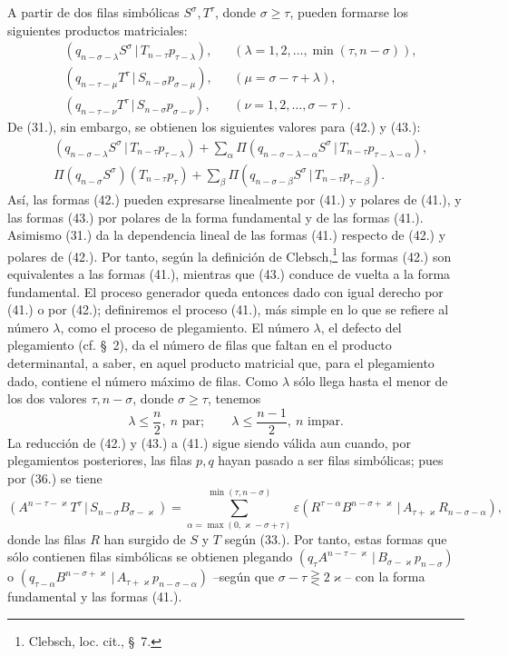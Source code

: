 \documentclass[11pt]{article}
\newcommand{\pair}[2]{(#1\,|\,#2)}
\newcommand{\eps}{\varepsilon}
\begin{document}
A partir de dos filas simbólicas $S^\sigma,T^\tau$, donde $\sigma\ge\tau$, pueden formarse los siguientes productos matriciales:
\begin{align}
&\pair{q_{n-\sigma-\lambda}S^\sigma}{T_{n-\tau}p_{\tau-\lambda}}, &&(\lambda=1,2,\ldots,\min(\tau,n-\sigma)),\tag{41}\\
&\pair{q_{n-\tau-\mu}T^\tau}{S_{n-\sigma}p_{\sigma-\mu}}, &&(\mu=\sigma-\tau+\lambda),\tag{42}\\
&\pair{q_{n-\tau-\nu}T^\tau}{S_{n-\sigma}p_{\sigma-\nu}}, &&(\nu=1,2,\ldots,\sigma-\tau).
\tag{43}
\end{align}
De (31.), sin embargo, se obtienen los siguientes valores para (42.) y (43.):
\begin{align}
&\pair{q_{n-\sigma-\lambda}S^\sigma}{T_{n-\tau}p_{\tau-\lambda}}
 +\sum_{\alpha}\Pi\pair{q_{n-\sigma-\lambda-\alpha}S^\sigma}{T_{n-\tau}p_{\tau-\lambda-\alpha}},\tag{42a}\\
&\Pi(q_{n-\sigma}S^\sigma)(T_{n-\tau}p_\tau)
 +\sum_{\beta}\Pi\pair{q_{n-\sigma-\beta}S^\sigma}{T_{n-\tau}p_{\tau-\beta}}.
\tag{43a}
\end{align}
Así, las formas (42.) pueden expresarse linealmente por (41.) y polares de (41.), y las formas (43.) por polares de la forma fundamental y de las formas (41.). Asimismo (31.) da la dependencia lineal de las formas (41.) respecto de (42.) y polares de (42.). Por tanto, según la definición de Clebsch,\footnote{Clebsch, loc. cit., \S\ 7.} las formas (42.) son equivalentes a las formas (41.), mientras que (43.) conduce de vuelta a la forma fundamental. El proceso generador queda entonces dado con igual derecho por (41.) o por (42.); definiremos el proceso (41.), más simple en lo que se refiere al número $\lambda$, como el proceso de plegamiento. El número $\lambda$, el defecto del plegamiento (cf. \S\ 2), da el número de filas que faltan en el producto determinantal, a saber, en aquel producto matricial que, para el plegamiento dado, contiene el número máximo de filas. Como $\lambda$ sólo llega hasta el menor de los dos valores $\tau,n-\sigma$, donde $\sigma\ge\tau$, tenemos
\begin{equation}
 \lambda\le\frac n2,\ n\text{ par};\qquad
 \lambda\le\frac{n-1}{2},\ n\text{ impar}.
\tag{44}
\end{equation}
La reducción de (42.) y (43.) a (41.) sigue siendo válida aun cuando, por plegamientos posteriores, las filas $p,q$ hayan pasado a ser filas simbólicas; pues por (36.) se tiene
\[
 \pair{A^{n-\tau-\varkappa}T^\tau}{S_{n-\sigma}B_{\sigma-\varkappa}}
 =\sum_{\alpha=\max(0,\varkappa-\sigma+\tau)}^{\min(\tau,n-\sigma)}
 \eps\pair{R^{\tau-\alpha}B^{n-\sigma+\varkappa}}{A_{\tau+\varkappa}R_{n-\sigma-\alpha}},
\]
donde las filas $R$ han surgido de $S$ y $T$ según (33.). Por tanto, estas formas que sólo contienen filas simbólicas se obtienen plegando $\pair{q_\tau A^{n-\tau-\varkappa}}{B_{\sigma-\varkappa}p_{n-\sigma}}$ o $\pair{q_{\tau-\alpha}B^{n-\sigma+\varkappa}}{A_{\tau+\varkappa}p_{n-\sigma-\alpha}}$ --según que $\sigma-\tau\gtreqless 2\varkappa$-- con la forma fundamental y las formas (41.).
\end{document}

